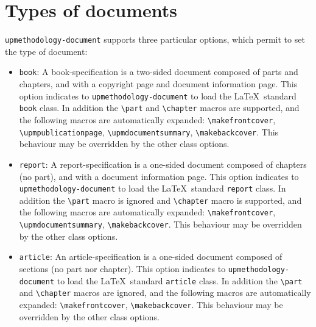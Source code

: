 \documentclass[book]{upmethodology-document}
\begin{document}
\section{Types of documents}\label{section:documentclass:doctype}

\texttt{upmethodology-document} supports three particular options, which permit to set the type of document:
\begin{itemize}
\item \texttt{book}: A book-specification is a two-sided document composed of parts and chapters, and with a copyright page and document information page. This option indicates to \texttt{upmethodology-document} to load the \LaTeX\ standard \texttt{book} class. In addition the \texttt{{\textbackslash}part} and \texttt{{\textbackslash}chapter} macros are supported, and the following macros are automatically expanded: \texttt{{\textbackslash}makefrontcover}, \texttt{{\textbackslash}upmpublicationpage}, \texttt{{\textbackslash}upmdocumentsummary}, \texttt{{\textbackslash}makebackcover}. This behaviour may be overridden by the other class options.

\item \texttt{report}: A report-specification is a one-sided document composed of chapters (no part), and with a document information page. This option indicates to \texttt{upmethodology-document} to load the \LaTeX\ standard \texttt{report} class. In addition the \texttt{{\textbackslash}part} macro is ignored and \texttt{{\textbackslash}chapter} macro is supported, and the following macros are automatically expanded: \texttt{{\textbackslash}makefrontcover}, \texttt{{\textbackslash}upmdocumentsummary}, \texttt{{\textbackslash}makebackcover}. This behaviour may be overridden by the other class options.

\item \texttt{article}: An article-specification is a one-sided document composed of sections (no part nor chapter). This option indicates to \texttt{upmethodology-document} to load the \LaTeX\ standard \texttt{article} class. In addition the \texttt{{\textbackslash}part} and \texttt{{\textbackslash}chapter} macros are ignored, and the following macros are automatically expanded: \texttt{{\textbackslash}makefrontcover}, \texttt{{\textbackslash}makebackcover}. This behaviour may be overridden by the other class options.

\end{itemize}
\end{document}
